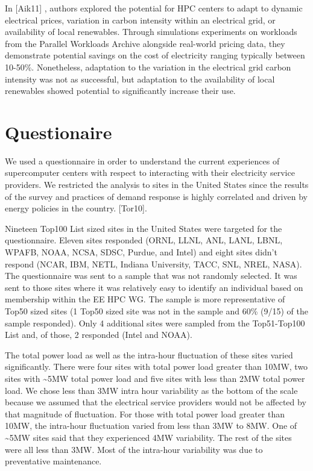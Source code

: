 \documentclass{llncs}
\begin{document}
In 
\cite{aikema_electrical_2011}
[Aik11] , authors explored the potential for HPC centers to adapt to
dynamic electrical prices, variation in carbon intensity within an
electrical grid, or availability of local renewables. Through simulations
experiments on workloads from the Parallel Workloads Archive alongside
real-world pricing data, they demonstrate potential savings on the cost of
electricity ranging typically between 10-50{\%}. Nonetheless, adaptation to
the variation in the electrical grid carbon intensity was not as successful,
but adaptation to the availability of local renewables showed potential to
significantly increase their use.

\section{Questionaire} 
We used a questionnaire in order to understand the current experiences of
supercomputer centers with respect to interacting with their electricity
service providers. We restricted the analysis to sites in the United States
since the results of the survey and practices of demand response is highly
correlated and driven by energy policies in the country. 
\cite{torriti_demand_2010}
[Tor10].

Nineteen Top100 List sized sites in the United States were targeted for the
questionnaire. Eleven sites responded (ORNL, LLNL, ANL, LANL, LBNL, WPAFB,
NOAA, NCSA, SDSC, Purdue, and Intel) and eight sites didn't respond (NCAR,
IBM, NETL, Indiana University, TACC, SNL, NREL, NASA). The questionnaire was
sent to a sample that was not randomly selected. It was sent to those sites
where it was relatively easy to identify an individual based on membership
within the EE HPC WG. The sample is more representative of Top50 sized sites
(1 Top50 sized site was not in the sample and 60{\%} (9/15) of the sample
responded). Only 4 additional sites were sampled from the Top51-Top100 List
and, of those, 2 responded (Intel and NOAA).

The total power load as well as the intra-hour fluctuation of these sites
varied significantly. There were four sites with total power load greater
than 10MW, two sites with \textasciitilde 5MW total power load and five
sites with less than 2MW total power load. We chose less than 3MW intra hour
variability as the bottom of the scale because we assumed that the
electrical service providers would not be affected by that magnitude of
fluctuation. For those with total power load greater than 10MW, the
intra-hour fluctuation varied from less than 3MW to 8MW. One of
\textasciitilde 5MW sites said that they experienced 4MW variability. The
rest of the sites were all less than 3MW. Most of the intra-hour variability
was due to preventative maintenance.
\end{document}
